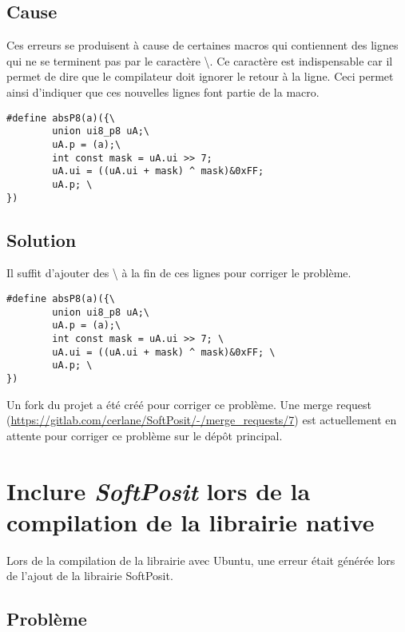 \subsection{Cause}

Ces erreurs se produisent à cause de certaines macros qui contiennent des lignes qui ne se terminent pas par le caractère \textbackslash. Ce caractère est indispensable car il permet de dire que le compilateur doit ignorer le retour à la ligne. Ceci permet ainsi d'indiquer que ces nouvelles lignes font partie de la macro.

\begin{verbatim}
#define absP8(a)({\
		union ui8_p8 uA;\
		uA.p = (a);\
		int const mask = uA.ui >> 7;
		uA.ui = ((uA.ui + mask) ^ mask)&0xFF;
		uA.p; \
})
\end{verbatim}

\subsection{Solution}

\begin{minipage2}
Il suffit d'ajouter des \textbackslash {} à la fin de ces lignes pour corriger le problème.

\begin{verbatim}
#define absP8(a)({\
		union ui8_p8 uA;\
		uA.p = (a);\
		int const mask = uA.ui >> 7; \
		uA.ui = ((uA.ui + mask) ^ mask)&0xFF; \
		uA.p; \
})
\end{verbatim}
\end{minipage2}

Un fork du projet a été créé pour corriger ce problème. Une merge request (\url{https://gitlab.com/cerlane/SoftPosit/-/merge_requests/7}) est actuellement en attente pour corriger ce problème sur le dépôt principal.

\section{Inclure \textit{SoftPosit} lors de la compilation de la librairie native}
\label{sec:problem_softposit_include}

Lors de la compilation de la librairie avec Ubuntu, une erreur était générée lors de l'ajout de la librairie \gls{SoftPosit}.

\subsection{Problème}

